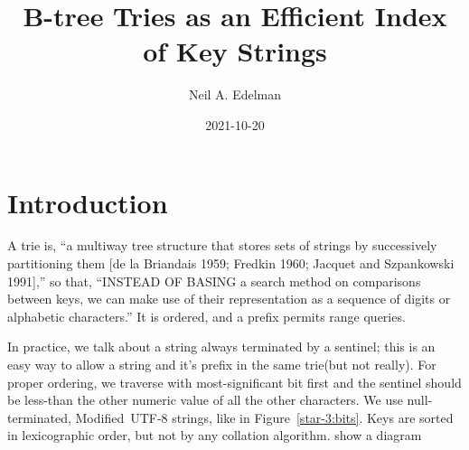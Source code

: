\documentclass[12pt]{article}
\author{Neil A. Edelman}
\title{B-tree Tries as an Efficient Index of Key Strings}
\date{2021-10-20}
\begin{document}
\maketitle


\section{Introduction}

A trie is, ``a multiway tree structure that stores sets of strings by successively partitioning them [de la Briandais 1959; Fredkin 1960; Jacquet and Szpankowski 1991],''\cite{askitis2011redesigning} so that, ``INSTEAD OF BASING a search method on comparisons between keys, we can make use of their representation as a sequence of digits or alphabetic characters.''\cite{knuth1997sorting} It is ordered, and a prefix permits range queries.

In practice, we talk about a string always terminated by a sentinel; this is an easy way to allow a string and it's prefix in the same trie\cite{fredkin1960trie}(but not really). For proper ordering, we traverse with most-significant bit first and the sentinel should be less-than the other numeric value of all the other characters. We use null-terminated, Modified~\mbox{UTF-8} strings, like in Figure~\ref{star-3:bits}. Keys are sorted in lexicographic order, but not by any collation algorithm. show a diagram
\end{document}
